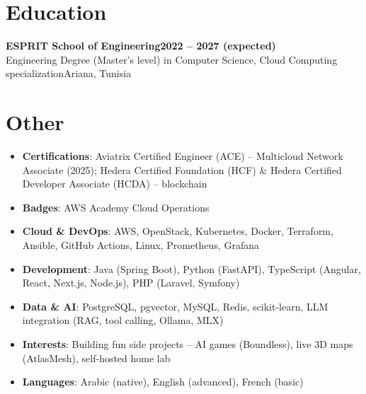 \documentclass[10pt]{article}
\newcommand{\entry}[4]{%
  \textbf{#1}\hfill\textbf{#2}\\
  #3\hfill #4\vspace{-1pt}}
\begin{document}
\section{Education}

\entry{ESPRIT School of Engineering}{2022 -- 2027 (expected)}{Engineering Degree (Master's level) in Computer Science, Cloud Computing specialization}{Ariana, Tunisia}

\section{Other}
\begin{itemize}
  \item \textbf{Certifications}: Aviatrix Certified Engineer (ACE) -- Multicloud Network Associate (2025); Hedera Certified Foundation (HCF) \& Hedera Certified Developer Associate (HCDA) -- blockchain
  \item \textbf{Badges}: AWS Academy Cloud Operations
  \item \textbf{Cloud \& DevOps}: AWS, OpenStack, Kubernetes, Docker, Terraform, Ansible, GitHub Actions, Linux, Prometheus, Grafana
  \item \textbf{Development}: Java (Spring Boot), Python (FastAPI), TypeScript (Angular, React, Next.js, Node.js), PHP (Laravel, Symfony)
  \item \textbf{Data \& AI}: PostgreSQL, pgvector, MySQL, Redis, scikit-learn, LLM integration (RAG, tool calling, Ollama, MLX)
  \item \textbf{Interests}: Building fun side projects -- AI games (Boundless), live 3D maps (AtlasMesh), self-hosted home lab
  \item \textbf{Languages}: Arabic (native), English (advanced), French (basic)
\end{itemize}
\end{document}
